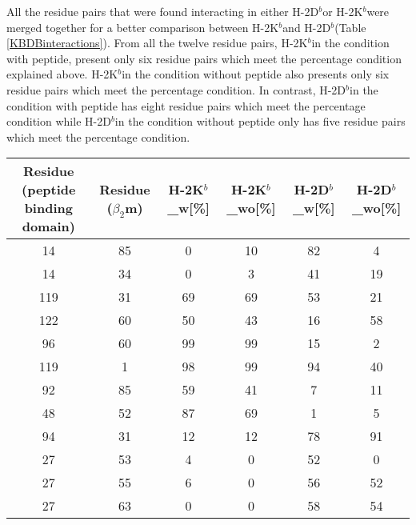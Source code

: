\documentclass[11pt,twocolumn]{article}
\newcommand{\db}{H-2D$^{b}$}
\newcommand{\kb}{H-2K$^{b}$}
\newcommand{\4}{four {\AA}ngstroms}
\begin{document}
All the residue pairs that were found interacting in either \db or \kb were merged together for a better comparison between \kb and \db  (Table \ref{KBDBinteractions}). From all the twelve residue pairs, \kb in the condition with peptide, present only six residue pairs which meet the percentage condition explained above. \kb in the condition without peptide also presents only six residue pairs which meet the percentage condition. In contrast, \db in the condition with peptide has eight residue pairs which meet the percentage condition while \db in the condition without peptide only has five residue pairs which meet the percentage condition. 

   



\begin{table*}
\caption{\textbf{ Compilation of the the interacting residues used for the analysis of \kb and \db, and the percentage of interactions bellow below four {\AA}ngstroms, of each analysed condition.} The residues interacting coming from the peptide binding domain, the residues interacting coming from $\beta_{2}$m and the percentage of their interaction which is below \4 is analysed in \db and \kb for the condition of with peptide and without peptide}
\label{KBDBinteractions}
\centering 
\resizebox{0.8\textwidth}{!} {
\begin{tabular}{|c|c|c|c|c|c|}  \hline
Residue (peptide binding domain)&Residue ($\beta_{2}$m)&H-2K$^{b}${\_}w[\%]&H-2K$^{b}${\_}wo[\%]&H-2D$^{b}${\_}w[\%]&H-2D$^{b}${\_}wo[\%]\\ \hline
14&85&0&10&82&4\\ \hline
14&34&0&3&41&19\\ \hline
119&31&69&69&53&21\\ \hline
122&60&50&43&16&58\\ \hline
96&60&99&99&15&2\\ \hline
119&1&98&99&94&40\\ \hline
92&85&59&41&7&11\\ \hline
48&52&87&69&1&5\\ \hline
94&31&12&12&78&91\\ \hline
27&53&4&0&52&0\\ \hline
27&55&6&0&56&52\\ \hline
27&63&0&0&58&54\\ \hline
\end{tabular}
}
\end{table*}
\end{document}
